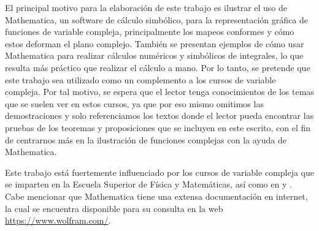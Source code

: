 \documentclass[letterpaper,12pt,openany]{book}
\theoremstyle{definition}
\theoremstyle{definition}
\theoremstyle{definition}
\theoremstyle{definition}
\theoremstyle{definition}
\theoremstyle{remark}
\theoremstyle{definition}
\begin{document}
	El principal motivo para la elaboración de este trabajo es ilustrar el uso de Mathematica, un software de cálculo simbólico, para la representación gráfica de funciones de variable compleja, principalmente los mapeos conformes y cómo estos deforman el plano complejo. También se presentan ejemplos de cómo usar Mathematica para realizar cálculos numéricos y simbólicos de integrales, lo que resulta más práctico que realizar el cálculo a mano. Por lo tanto, se pretende que este trabajo sea utilizado como un complemento a los cursos de variable compleja. Por tal motivo, se espera que el lector tenga conocimientos de los temas que se suelen ver en estos cursos, ya que por eso mismo omitimos las demostraciones y solo referenciamos los textos donde el lector pueda encontrar las pruebas de los teoremas y proposiciones que se incluyen en este escrito, con el fin de centrarnos más en la ilustración de funciones complejas con la ayuda de Mathematica.
	
	Este trabajo está fuertemente influenciado por los cursos de variable compleja que se imparten en la Escuela Superior de Física y Matemáticas, así como en \cite{shaw} y \cite{silverman}. Cabe mencionar que Mathematica tiene una extensa documentación en internet, la cual se encuentra disponible para su consulta en la web \url{https://www.wolfram.com/}.
	\mainmatter
	
	
	
	
	
	
	
	
	
	
	
%	
	
	\nocite{tarlok}
	\nocite{silverman}
	\nocite{shaw}
	\nocite{ComplexRegionPlot}
	\nocite{marsden}
	\nocite{Churchill}
	\nocite{ahlfors}
	\nocite{rajeev}
	\nocite{Driscoll}
	\nocite{Abramowitz}
	\nocite{Beta}
	\nocite{BetaInc}
	\nocite{Pearson}
	\nocite{BetaR}
	\nocite{Conway}
	\nocite{Elliptic}
	\nocite{Hypergeometric2F1}
	\nocite{ComplexPlot}
	\nocite{ComplexPlot3D}
	\nocite{ComplexContourPlot}
	\nocite{Shaw-A}
	\nocite{GeometryJo}
	\nocite{ComplexVector}
	\nocite{Domain_coloring}
	\nocite{cartan}
	
\end{document}
